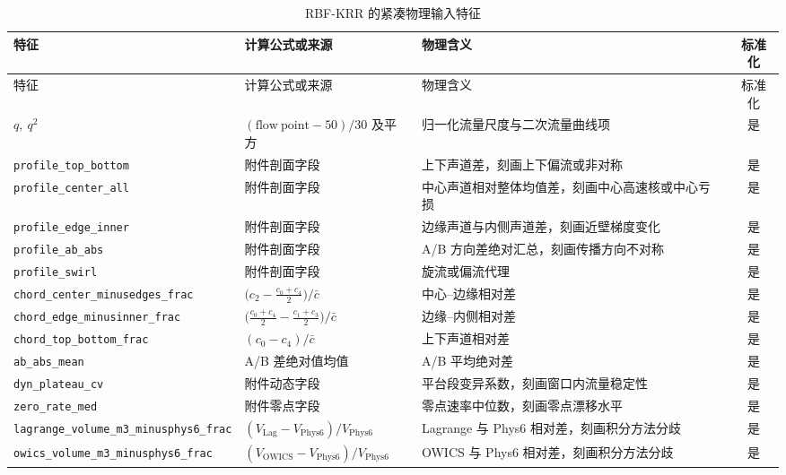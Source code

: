\begingroup
\scriptsize
\begin{longtable}{p{}p{}p{}c}
\caption{RBF-KRR 的紧凑物理输入特征}
\label{tab:final_features}\\
\toprule
特征 & 计算公式或来源 & 物理含义 & 标准化 \\
\midrule
\endfirsthead
\toprule
特征 & 计算公式或来源 & 物理含义 & 标准化 \\
\midrule
\endhead
$q,\ q^2$ & $(\mathrm{flow\ point}-50)/30$ 及平方 & 归一化流量尺度与二次流量曲线项 & 是 \\
\texttt{profile\_top\_bottom} & 附件剖面字段 & 上下声道差，刻画上下偏流或非对称 & 是 \\
\texttt{profile\_center\_all} & 附件剖面字段 & 中心声道相对整体均值差，刻画中心高速核或中心亏损 & 是 \\
\texttt{profile\_edge\_inner} & 附件剖面字段 & 边缘声道与内侧声道差，刻画近壁梯度变化 & 是 \\
\texttt{profile\_ab\_abs} & 附件剖面字段 & A/B 方向差绝对汇总，刻画传播方向不对称 & 是 \\
\texttt{profile\_swirl} & 附件剖面字段 & 旋流或偏流代理 & 是 \\
\texttt{chord\_center\_minus}\newline\texttt{edges\_frac} & $\bigl(c_2-\frac{c_0+c_4}{2}\bigr)/\bar c$ & 中心--边缘相对差 & 是 \\
\texttt{chord\_edge\_minus}\newline\texttt{inner\_frac} & $\bigl(\frac{c_0+c_4}{2}-\frac{c_1+c_3}{2}\bigr)/\bar c$ & 边缘--内侧相对差 & 是 \\
\texttt{chord\_top\_bottom\_frac} & $(c_0-c_4)/\bar c$ & 上下声道相对差 & 是 \\
\texttt{ab\_abs\_mean} & A/B 差绝对值均值 & A/B 平均绝对差 & 是 \\
\texttt{dyn\_plateau\_cv} & 附件动态字段 & 平台段变异系数，刻画窗口内流量稳定性 & 是 \\
\texttt{zero\_rate\_med} & 附件零点字段 & 零点速率中位数，刻画零点漂移水平 & 是 \\
\texttt{lagrange\_volume\_m3\_minus}\newline\texttt{phys6\_frac} & $(V_{\mathrm{Lag}}-V_{\mathrm{Phys6}})/V_{\mathrm{Phys6}}$ & Lagrange 与 Phys6 相对差，刻画积分方法分歧 & 是 \\
\texttt{owics\_volume\_m3\_minus}\newline\texttt{phys6\_frac} & $(V_{\mathrm{OWICS}}-V_{\mathrm{Phys6}})/V_{\mathrm{Phys6}}$ & OWICS 与 Phys6 相对差，刻画积分方法分歧 & 是 \\
\bottomrule
\end{longtable}
\endgroup

